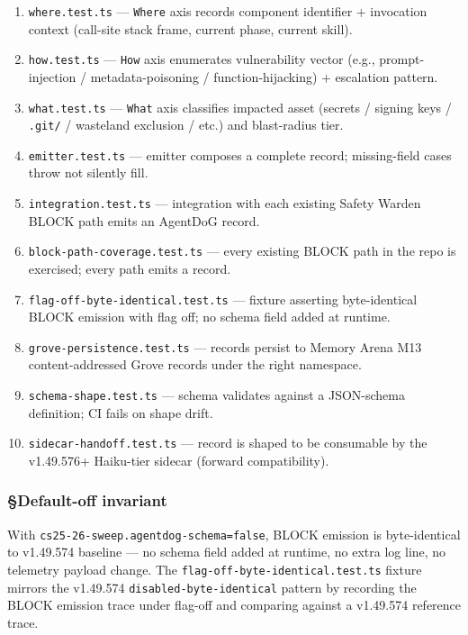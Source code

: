 \documentclass[11pt,letterpaper]{article}
\providecommand{\tightlist}{\setlength{\itemsep}{0pt}\setlength{\parskip}{0pt}}
\begin{document}
\begin{enumerate}
\def\labelenumi{\arabic{enumi}.}
\tightlist
\item
  \texttt{where.test.ts} --- \texttt{Where} axis records component
  identifier + invocation context (call-site stack frame, current phase,
  current skill).
\item
  \texttt{how.test.ts} --- \texttt{How} axis enumerates vulnerability
  vector (e.g., prompt-injection / metadata-poisoning /
  function-hijacking) + escalation pattern.
\item
  \texttt{what.test.ts} --- \texttt{What} axis classifies impacted asset
  (secrets / signing keys / \texttt{.git/} / wasteland exclusion / etc.)
  and blast-radius tier.
\item
  \texttt{emitter.test.ts} --- emitter composes a complete record;
  missing-field cases throw not silently fill.
\item
  \texttt{integration.test.ts} --- integration with each existing Safety
  Warden BLOCK path emits an AgentDoG record.
\item
  \texttt{block-path-coverage.test.ts} --- every existing BLOCK path in
  the repo is exercised; every path emits a record.
\item
  \texttt{flag-off-byte-identical.test.ts} --- fixture asserting
  byte-identical BLOCK emission with flag off; no schema field added at
  runtime.
\item
  \texttt{grove-persistence.test.ts} --- records persist to Memory Arena
  M13 content-addressed Grove records under the right namespace.
\item
  \texttt{schema-shape.test.ts} --- schema validates against a
  JSON-schema definition; CI fails on shape drift.
\item
  \texttt{sidecar-handoff.test.ts} --- record is shaped to be consumable
  by the v1.49.576+ Haiku-tier sidecar (forward compatibility).
\end{enumerate}

\subsubsection{§Default-off invariant}

With \texttt{cs25-26-sweep.agentdog-schema=false}, BLOCK emission is
byte-identical to v1.49.574 baseline --- no schema field added at
runtime, no extra log line, no telemetry payload change. The
\texttt{flag-off-byte-identical.test.ts} fixture mirrors the v1.49.574
\texttt{disabled-byte-identical} pattern by recording the BLOCK emission
trace under flag-off and comparing against a v1.49.574 reference trace.
\end{document}
